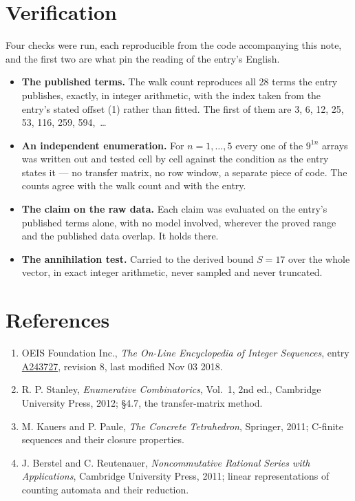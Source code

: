 \documentclass[11pt]{article}
\theoremstyle{definition}
\begin{document}
\section{Verification}

Four checks were run, each reproducible from the code accompanying this note, and the first two are what pin the reading of the entry's English.

\begin{itemize}

\item {\bfseries The published terms.} The walk count reproduces all 28 terms the entry publishes, exactly, in integer arithmetic, with the index taken from the entry's stated offset (1) rather than fitted. The first of them are 3, 6, 12, 25, 53, 116, 259, 594,~\dots

\item {\bfseries An independent enumeration.} For $n = 1,\dots,5$ every one of the $9^{1n}$ arrays was written out and tested cell by cell against the condition as the entry states it --- no transfer matrix, no row window, a separate piece of code. The counts agree with the walk count and with the entry.

\item {\bfseries The claim on the raw data.} Each claim was evaluated on the entry's published terms alone, with no model involved, wherever the proved range and the published data overlap. It holds there.

\item {\bfseries The annihilation test.} Carried to the derived bound $S = 17$ over the whole vector, in exact integer arithmetic, never sampled and never truncated.

\end{itemize}

\section{References}

\begin{enumerate}

\item OEIS Foundation Inc., \emph{The On-Line Encyclopedia of Integer Sequences}, entry \href{https://oeis.org/A243727}{A243727}, revision 8, last modified Nov 03 2018.

\item R. P. Stanley, \emph{Enumerative Combinatorics}, Vol.~1, 2nd ed., Cambridge University Press, 2012; \S4.7, the transfer-matrix method.

\item M. Kauers and P. Paule, \emph{The Concrete Tetrahedron}, Springer, 2011; C-finite sequences and their closure properties.

\item J. Berstel and C. Reutenauer, \emph{Noncommutative Rational Series with Applications}, Cambridge University Press, 2011; linear representations of counting automata and their reduction.

\end{enumerate}
\end{document}
